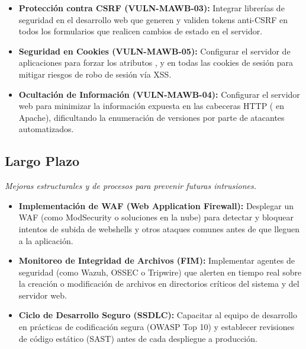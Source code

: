 \documentclass[a4paper]{article}
\newcommand{\maquinaID}{MAWB} %
\begin{document}
\begin{itemize}
    \item \textbf{Protección contra CSRF (VULN-\maquinaID-03):} 
    Integrar librerías de seguridad en el desarrollo web que generen y validen tokens anti-CSRF en todos los formularios que realicen cambios de estado en el servidor.
    
    \item \textbf{Seguridad en Cookies (VULN-\maquinaID-05):} 
    Configurar el servidor de aplicaciones para forzar los atributos ,  y  en todas las cookies de sesión para mitigar riesgos de robo de sesión vía XSS.
    
    \item \textbf{Ocultación de Información (VULN-\maquinaID-04):} 
    Configurar el servidor web para minimizar la información expuesta en las cabeceras HTTP ( en Apache), dificultando la enumeración de versiones por parte de atacantes automatizados.
\end{itemize}

\subsection{Largo Plazo}
\textit{Mejoras estructurales y de procesos para prevenir futuras intrusiones.}

\begin{itemize}
    \item \textbf{Implementación de WAF (Web Application Firewall):} 
    Desplegar un WAF (como ModSecurity o soluciones en la nube) para detectar y bloquear intentos de subida de webshells y otros ataques comunes antes de que lleguen a la aplicación.
    
    \item \textbf{Monitoreo de Integridad de Archivos (FIM):} 
    Implementar agentes de seguridad (como Wazuh, OSSEC o Tripwire) que alerten en tiempo real sobre la creación o modificación de archivos en directorios críticos del sistema y del servidor web.
    
    \item \textbf{Ciclo de Desarrollo Seguro (SSDLC):} 
    Capacitar al equipo de desarrollo en prácticas de codificación segura (OWASP Top 10) y establecer revisiones de código estático (SAST) antes de cada despliegue a producción.
\end{itemize}

\clearpage
\end{document}
